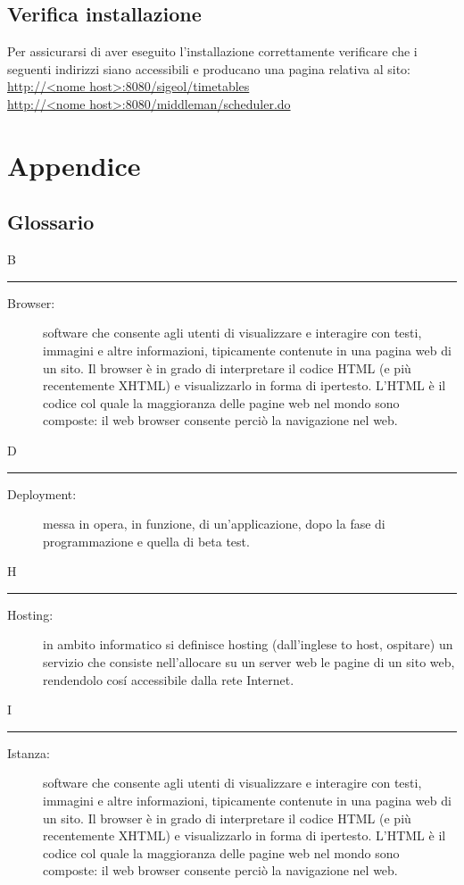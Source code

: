 \documentclass[11pt,a4paper]{article}
\begin{document}
\subsection{Verifica installazione}
Per assicurarsi di aver eseguito l'installazione correttamente verificare che i seguenti indirizzi siano accessibili e producano una pagina relativa al sito:
\url{http://<nome host>:8080/sigeol/timetables}\\
\url{http://<nome host>:8080/middleman/scheduler.do}
\section{Appendice}
\subsection{Glossario}
\flushleft 
\Huge B \bigskip
\hrule
\smallskip
\normalsize
\begin{description}
	\item[Browser:] software che consente agli utenti di visualizzare e interagire con testi, immagini e altre informazioni, tipicamente contenute in una pagina web di un sito. Il browser è in grado di interpretare il codice HTML (e più recentemente XHTML) e visualizzarlo in forma di ipertesto. L'HTML è il codice col quale la maggioranza delle pagine web nel mondo sono composte: il web browser consente perciò la navigazione nel web.
\end{description}
\bigskip
\Huge D \bigskip
\hrule
\smallskip
\normalsize
\begin{description}
	\item[Deployment:] messa in opera, in funzione, di un'applicazione, dopo la fase di programmazione e quella di beta test.
\end{description}
\bigskip
\Huge H \bigskip
\hrule
\smallskip
\normalsize
\begin{description}
	\item[Hosting:] in ambito informatico si definisce hosting (dall'inglese to host, ospitare) un servizio che consiste nell'allocare su un server web le pagine di un sito web, rendendolo cosí accessibile dalla rete Internet.

\end{description}
\bigskip
\Huge I \bigskip
\hrule
\smallskip
\normalsize
\begin{description}
	\item[Istanza:] software che consente agli utenti di visualizzare e interagire con testi, immagini e altre informazioni, tipicamente contenute in una pagina web di un sito. Il browser è in grado di interpretare il codice HTML (e più recentemente XHTML) e visualizzarlo in forma di ipertesto. L'HTML è il codice col quale la maggioranza delle pagine web nel mondo sono composte: il web browser consente perciò la navigazione nel web.
\end{description}
\end{document}
